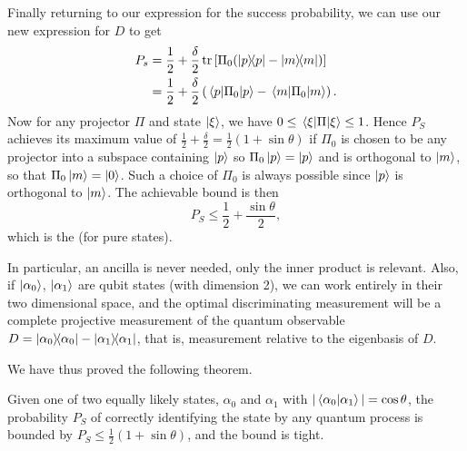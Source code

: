 \documentclass[a4paper]{article}
\begin{document}
Finally returning to our expression for the success probability,
we can use our new expression for $D$ to get
\begin{align*}
	P_s &= \frac{1}{2} + \frac{\delta}{2}\tr\left[\Pi_0 (\dyad{p} - \dyad{m})\right] \\
	&= \frac{1}{2} + \frac{\delta}{2}\left(\ev{\Pi_0}{p} - \ev{\Pi_0}{m}\right).
\end{align*}
Now for any projector $\Pi$ and state $\ket{\xi}$, we have $0 \leq \ev{\Pi}{\xi} \leq 1$. Hence $P_S$ achieves its maximum value of $\frac{1}{2} + \frac{\delta}{2} = \frac{1}{2}(1 + \sin \theta)$ if $\Pi_0$ is chosen to be any projector into a subspace containing $\ket{p}$ so $\Pi_0\ket{p} = \ket{p}$ and is orthogonal to $\ket{m}$, so that $\Pi_0 \ket{m} = \ket{0}$. Such a choice of $\Pi_0$ is always possible since $\ket{p}$ is orthogonal to $\ket{m}$. The achievable bound is then
$$
P_S \leq \frac{1}{2} + \frac{\sin \theta}{2},
$$
which is the  (for pure states). 

In particular, an ancilla is never needed, only the inner product is relevant. Also, if $\ket{\alpha_0}$, $\ket{\alpha_1}$ are qubit states (with dimension 2), we can work entirely in their two dimensional space, and the optimal discriminating measurement will be a complete projective measurement of the quantum observable $D = \dyad{\alpha_0} - \dyad{\alpha_1}$, that is, measurement relative to the eigenbasis of $D$. 

We have thus proved the following theorem.

\begin{theorem}
	Given one of two equally likely states, $\alpha_0$ and $\alpha_1$ with $|\ip{\alpha_0}{\alpha_1}| = \cos \theta$, the probability $P_S$ of correctly identifying the state by any quantum process is bounded by $P_S \leq \frac{1}{2}(1 + \sin \theta)$, and the bound is tight.
\end{theorem}
\end{document}
